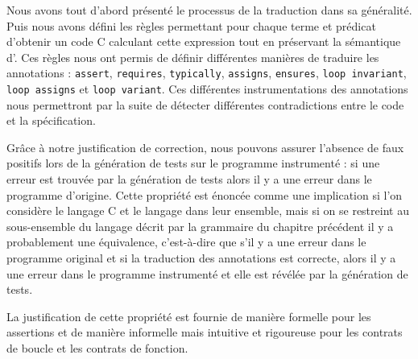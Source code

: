 Nous avons tout d'abord présenté le processus de la traduction dans sa
généralité.
Puis nous avons défini les règles permettant pour chaque terme et prédicat
\eacsl d'obtenir un code C calculant cette expression tout en préservant la
sémantique d'\eacsl.
Ces règles nous ont permis de définir différentes manières de traduire les
annotations \eacsl : \lstinline'assert', \lstinline'requires',
\lstinline'typically', \lstinline'assigns', \lstinline'ensures',
\lstinline'loop invariant', \lstinline'loop assigns' et
\lstinline'loop variant'.
Ces différentes instrumentations des annotations nous permettront par la suite
de détecter différentes contradictions entre le code et la spécification.

Grâce à notre justification de correction, nous pouvons assurer l'absence de
faux positifs lors de la génération de tests sur le programme instrumenté : si
une erreur est trouvée par la génération de tests alors il y a une erreur dans
le programme d'origine.
Cette propriété est énoncée comme une implication si l'on considère le langage
C et le langage \eacsl dans leur ensemble, mais si on se restreint au
sous-ensemble du langage décrit par la grammaire du chapitre précédent il y a
probablement une équivalence, c'est-à-dire que s'il y a une erreur dans le
programme original et si la traduction des annotations \eacsl est correcte,
alors il y a une erreur dans le programme instrumenté et elle est révélée par la
génération de tests.

La justification de cette propriété est fournie de manière formelle pour les
assertions et de manière informelle mais intuitive et rigoureuse pour les
contrats de boucle et les contrats de fonction.
